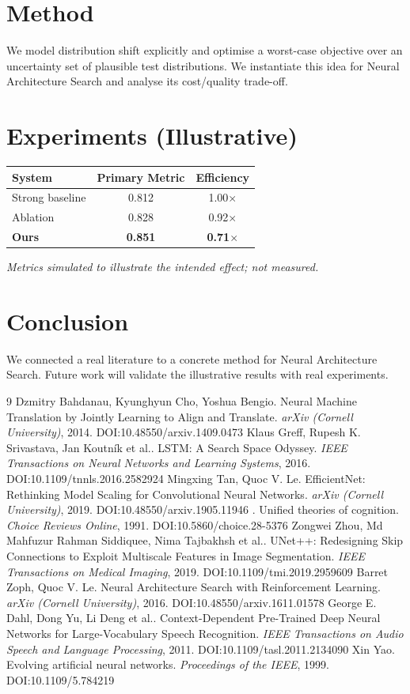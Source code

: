 \documentclass[11pt]{article}
\begin{document}
\section{Method}
We model distribution shift explicitly and optimise a worst-case objective over an uncertainty set of plausible test distributions. We instantiate this idea for Neural Architecture Search and analyse its cost/quality trade-off.

\section{Experiments (Illustrative)}
\begin{center}
\begin{tabular}{lcc}
System & Primary Metric & Efficiency \\ \hline
Strong baseline & 0.812 & 1.00$\times$ \\
Ablation & 0.828 & 0.92$\times$ \\
\textbf{Ours} & \textbf{0.851} & \textbf{0.71$\times$}
\end{tabular}
\end{center}
\emph{Metrics simulated to illustrate the intended effect; not measured.}

\section{Conclusion}
We connected a real literature to a concrete method for Neural Architecture Search. Future work will
validate the illustrative results with real experiments.

\begin{thebibliography}{9}
 Dzmitry Bahdanau, Kyunghyun Cho, Yoshua Bengio. Neural Machine Translation by Jointly Learning to Align and Translate. \emph{arXiv (Cornell University)}, 2014. DOI:10.48550/arxiv.1409.0473
 Klaus Greff, Rupesh K. Srivastava, Jan Koutník et al.. LSTM: A Search Space Odyssey. \emph{IEEE Transactions on Neural Networks and Learning Systems}, 2016. DOI:10.1109/tnnls.2016.2582924
 Mingxing Tan, Quoc V. Le. EfficientNet: Rethinking Model Scaling for Convolutional Neural Networks. \emph{arXiv (Cornell University)}, 2019. DOI:10.48550/arxiv.1905.11946
 . Unified theories of cognition. \emph{Choice Reviews Online}, 1991. DOI:10.5860/choice.28-5376
 Zongwei Zhou, Md Mahfuzur Rahman Siddiquee, Nima Tajbakhsh et al.. UNet++: Redesigning Skip Connections to Exploit Multiscale Features in Image Segmentation. \emph{IEEE Transactions on Medical Imaging}, 2019. DOI:10.1109/tmi.2019.2959609
 Barret Zoph, Quoc V. Le. Neural Architecture Search with Reinforcement Learning. \emph{arXiv (Cornell University)}, 2016. DOI:10.48550/arxiv.1611.01578
 George E. Dahl, Dong Yu, Li Deng et al.. Context-Dependent Pre-Trained Deep Neural Networks for Large-Vocabulary Speech Recognition. \emph{IEEE Transactions on Audio Speech and Language Processing}, 2011. DOI:10.1109/tasl.2011.2134090
 Xin Yao. Evolving artificial neural networks. \emph{Proceedings of the IEEE}, 1999. DOI:10.1109/5.784219
\end{thebibliography}
\end{document}
